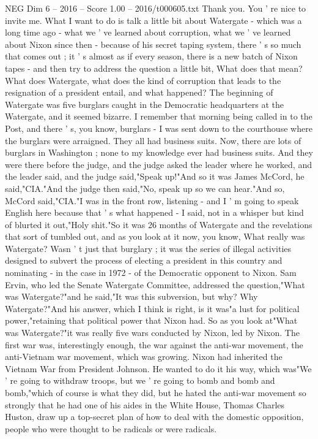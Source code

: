 \begin{textsample}{NEG Dim 6 – 2016 – Score 1.00 – 2016/t000605.txt}  \label{ex:f6_neg_033}
Thank you.
You ' re nice to invite me.
What I want to do is talk a little bit about Watergate - which was a long time ago - what we ' ve learned about corruption, what we ' ve learned about Nixon since then - because of his secret taping system, there ' s so much that comes out ; it ' s almost as if every season, there is a new batch of Nixon tapes - and then try to address the question a little bit, What does that mean?
What does Watergate, what does the kind of corruption that leads to the resignation of a president entail, and what happened?
The beginning of Watergate was five burglars caught in the Democratic headquarters at the Watergate, and it seemed bizarre.
I remember that morning being called in to the Post, and there ' s, you know, burglars - I was sent down to the courthouse where the burglars were arraigned.
They all had business suits.
Now, there are lots of burglars in Washington ; none to my knowledge ever had business suits.
And they were there before the judge, and the judge asked the leader where he worked, and the leader said, and the judge said,"Speak up!"And so it was James McCord, he said,"CIA."And the judge then said,"No, speak up so we can hear."And so, McCord said,"CIA."I was in the front row, listening - and I ' m going to speak English here because that ' s what happened - I said, not in a whisper but kind of blurted it out,"Holy shit."So it was 26 months of Watergate and the revelations that sort of tumbled out, and as you look at it now, you know, What really was Watergate?
Wasn ' t just that burglary ; it was the series of illegal activities designed to subvert the process of electing a president in this country and nominating - in the case in 1972 - of the Democratic opponent to Nixon.
Sam Ervin, who led the Senate Watergate Committee, addressed the question,"What was Watergate?"and he said,"It was this subversion, but why?
Why Watergate?"And his answer, which I think is right, is it was"a lust for political power,"retaining that political power that Nixon had.
So as you look at"What was Watergate?"it was really five wars conducted by Nixon, led by Nixon.
The first war was, interestingly enough, the war against the anti-war movement, the anti-Vietnam war movement, which was growing.
Nixon had inherited the Vietnam War from President Johnson.
He wanted to do it his way, which was"We ' re going to withdraw troops, but we ' re going to bomb and bomb and bomb,"which of course is what they did, but he hated the anti-war movement so strongly that he had one of his aides in the White House, Thomas Charles Huston, draw up a top-secret plan of how to deal with the domestic opposition, people who were thought to be radicals or were radicals.

\end{textsample}
